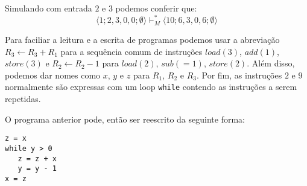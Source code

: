 \begin{example}

  Simulando com entrada $2$ e $3$ podemos conferir que:
\begin{displaymath}
\langle 1;2,3,0,0; \emptyset \rangle \vdash_M^* \langle 10; 6,3,0,6; \emptyset\rangle
\end{displaymath}
  
Para faciliar a leitura e a escrita de programas podemos usar a abreviação $R_3 \leftarrow R_3 + R_1$ para a sequência comum de instruções $load(3)$, $add(1)$, $store(3)$ e $R_2 \leftarrow R_2 - 1$ para $load(2)$, $sub(=1)$, $store(2)$.
Além disso, podemos dar nomes como $x$, $y$ e $z$ para $R_1$, $R_2$ e $R_3$.
Por fim, as instruções $2$ e $9$ normalmente são expressas com um loop {\tt while} contendo as instruções a serem repetidas.

O programa anterior pode, então ser reescrito da seguinte forma:

\begin{verbatim}
z = x
while y > 0
   z = z + x
   y = y - 1
x = z
\end{verbatim}
\end{example}

